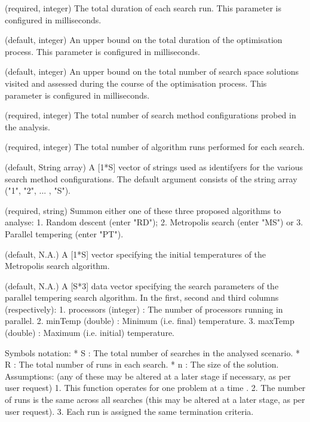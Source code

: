 \documentclass[a4paper]{book}
\begin{document}
\begin{Arguments}
\begin{ldescription}
\item[\code{maximumSearchTime}] (required, integer) The total duration of each search run.
This parameter is configured in milliseconds.

\item[\code{timeWithoutImprovement}] (default, integer) An upper bound on the total duration of the optimisation process.
This parameter is configured in milliseconds.

\item[\code{maximumNumberMoves}] (default, integer) An upper bound on the total number of search space solutions visited and assessed during the course of the optimisation process.
This parameter is configured in milliseconds.

\item[\code{numberSearches}] (required, integer) The total number of search method configurations probed in the analysis.

\item[\code{numberRuns}] (required, integer) The total number of algorithm runs performed for each search.

\item[\code{searchIds}] (default, String array) A [1*S] vector of strings used as identifyers for the various search method configurations.
The default argument consists of the string array ("1", "2", ... , "S").

\item[\code{searchMethod}] (required, string) Summon either one of these three proposed algorithms to analyse: 
1. Random descent (enter "RD"); 
2. Metropolis search (enter "MS") or 
3. Parallel  tempering (enter "PT").

\item[\code{analysisParametersMS}] (default, N.A.) A [1*S] vector specifying the initial temperatures of the Metropolis search algorithm.

\item[\code{analysisParametersPT}] (default, N.A.) A [S*3] data vector specifying the search parameters of the parallel tempering search algorithm.
In the first, second and third columns (respectively):
1. processors (integer) : The number of processors running in parallel.
2. minTemp (double) : Minimum (i.e. final) temperature.
3. maxTemp (double) : Maximum (i.e. initial) temperature.
\end{ldescription}
\end{Arguments}
%
\begin{Details}\relax
Symbols notation:
* S : The total number of searches in the analysed scenario.
* R : The total number of runs in each search.
* n : The size of the solution.
Assumptions: (any of these may be altered at a later stage if necessary, as per user request) 
1. This function operates for one problem at a time .
2. The number of runs is the same across all searches (this may be altered at a later stage, as per user request).
3. Each run is assigned the same termination criteria.
\end{Details}
\end{document}
